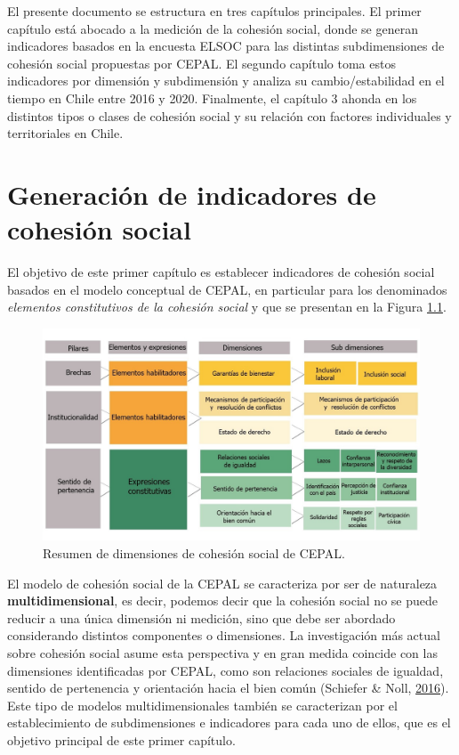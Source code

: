 \documentclass[
  12pt,
]{book}
\begin{document}
El presente documento se estructura en tres capítulos principales. El primer capítulo está abocado a la medición de la cohesión social, donde se generan indicadores basados en la encuesta ELSOC para las distintas subdimensiones de cohesión social propuestas por CEPAL. El segundo capítulo toma estos indicadores por dimensión y subdimensión y analiza su cambio/estabilidad en el tiempo en Chile entre 2016 y 2020. Finalmente, el capítulo 3 ahonda en los distintos tipos o clases de cohesión social y su relación con factores individuales y territoriales en Chile.

\hypertarget{generaciuxf3n-de-indicadores-de-cohesiuxf3n-social}{%
\chapter{Generación de indicadores de cohesión social}\label{generaciuxf3n-de-indicadores-de-cohesiuxf3n-social}}

El objetivo de este primer capítulo es establecer indicadores de cohesión social basados en el modelo conceptual de CEPAL, en particular para los denominados \emph{elementos constitutivos de la cohesión social} y que se presentan en la Figura \ref{fig:esquema-cepal}.

\begin{figure}[H]

{\centering \includegraphics[width=1\linewidth,height=1\textheight]{images/dimensiones-cepal} 

}

\caption{Resumen de dimensiones de cohesión social de CEPAL.}\label{fig:esquema-cepal}
\end{figure}

El modelo de cohesión social de la CEPAL se caracteriza por ser de naturaleza \textbf{multidimensional}, es decir, podemos decir que la cohesión social no se puede reducir a una única dimensión ni medición, sino que debe ser abordado considerando distintos componentes o dimensiones. La investigación más actual sobre cohesión social asume esta perspectiva y en gran medida coincide con las dimensiones identificadas por CEPAL, como son relaciones sociales de igualdad, sentido de pertenencia y orientación hacia el bien común (Schiefer \& Noll, \protect\hyperlink{ref-schiefer_essentials_2016}{2016}). Este tipo de modelos multidimensionales también se caracterizan por el establecimiento de subdimensiones e indicadores para cada uno de ellos, que es el objetivo principal de este primer capítulo.
\end{document}
